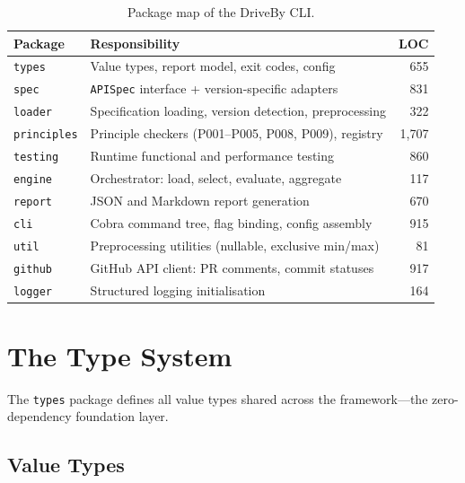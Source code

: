 \begin{table}[htbp]
\centering
\caption{Package map of the DriveBy CLI.}
\label{tab:package-map}
\small
\begin{tabular}{@{}llr@{}}
\toprule
\textbf{Package} & \textbf{Responsibility} & \textbf{LOC} \\
\midrule
\texttt{types}      & Value types, report model, exit codes, config     & 655 \\
\texttt{spec}       & \texttt{APISpec} interface + version-specific adapters     & 831 \\
\texttt{loader}     & Specification loading, version detection, preprocessing & 322 \\
\texttt{principles} & Principle checkers (P001--P005, P008, P009), registry & 1{,}707 \\
\texttt{testing}    & Runtime functional and performance testing        & 860 \\
\texttt{engine}     & Orchestrator: load, select, evaluate, aggregate   & 117 \\
\texttt{report}     & JSON and Markdown report generation               & 670 \\
\texttt{cli}        & Cobra command tree, flag binding, config assembly & 915 \\
\texttt{util}       & Preprocessing utilities (nullable, exclusive min/max) & 81 \\
\texttt{github}     & GitHub API client: PR comments, commit statuses   & 917 \\
\texttt{logger}     & Structured logging initialisation                 & 164 \\
\bottomrule
\end{tabular}
\end{table}

\section{The Type System}
\label{sec:type-system}

The \texttt{types} package defines all value types shared across the framework---the zero-dependency foundation layer.

\subsection{Value Types}
\label{subsec:value-types}

